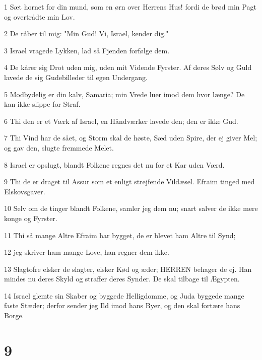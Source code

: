 \par 1 Sæt hornet for din mund, som en ørn over Herrens Hus! fordi de brød min Pagt og overtrådte min Lov.
\par 2 De råber til mig: "Min Gud! Vi, Israel, kender dig."
\par 3 Israel vragede Lykken, lad så Fjenden forfølge dem.
\par 4 De kårer sig Drot uden mig, uden mit Vidende Fyrster. Af deres Sølv og Guld lavede de sig Gudebilleder til egen Undergang.
\par 5 Modbydelig er din kalv, Samaria; min Vrede luer imod dem hvor længe? De kan ikke slippe for Straf.
\par 6 Thi den er et Værk af Israel, en Håndværker lavede den; den er ikke Gud.
\par 7 Thi Vind har de sået, og Storm skal de høste, Sæd uden Spire, der ej giver Mel; og gav den, slugte fremmede Melet.
\par 8 Israel er opslugt, blandt Folkene regnes det nu for et Kar uden Værd.
\par 9 Thi de er draget til Assur som et enligt strejfende Vildæsel. Efraim tinged med Elskovsgaver.
\par 10 Selv om de tinger blandt Folkene, samler jeg dem nu; snart salver de ikke mere konge og Fyrster.
\par 11 Thi så mange Altre Efraim har bygget, de er blevet ham Altre til Synd;
\par 12 jeg skriver ham mange Love, han regner dem ikke.
\par 13 Slagtofre elsker de slagter, elsker Kød og æder; HERREN behager de ej. Han mindes nu deres Skyld og straffer deres Synder. De skal tilbage til Ægypten.
\par 14 Israel glemte sin Skaber og byggede Helligdomme, og Juda byggede mange faste Stæder; derfor sender jeg Ild imod hans Byer, og den skal fortære hans Borge.

\chapter{9}

